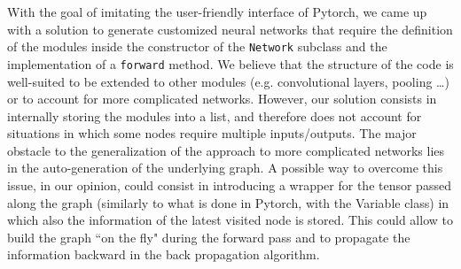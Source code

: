 \documentclass[10pt,final,a4paper]{article}
\begin{document}
With the goal of imitating the user-friendly interface of Pytorch, we came up with a solution to generate customized neural networks that require the definition of the modules inside the constructor of the \verb|Network| subclass and the implementation of a \verb|forward| method. We believe that the structure of the code is well-suited to be extended to other modules (e.g. convolutional layers, pooling \ldots) or to account for more complicated networks. However, our solution consists in internally storing the modules into a list, and therefore does not account for situations in which some nodes require multiple inputs/outputs. The major obstacle to the generalization of the approach to more complicated networks lies in the auto-generation of the underlying graph. A possible way to overcome this issue, in our opinion, could consist in introducing a wrapper for the tensor passed along the graph (similarly to what is done in Pytorch, with the Variable class) in which also the information of the latest visited node is stored. This could allow to build the graph ``on the fly" during the forward pass and to propagate the information backward in the back propagation algorithm.
\end{document}
